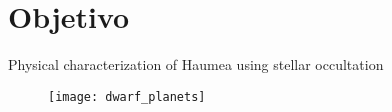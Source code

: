 \section{Objetivo} %

\label{sec:intro}

\begin{frame}[c]{}{}

	\begin{block}{}
		Physical characterization of Haumea using stellar occultation 
	\end{block}


	\begin{figure}[tb]
		\centering
		\texttt{[image: dwarf\_planets]}
		\label{fig:figure1}
	\end{figure}




	
	
\end{frame}

